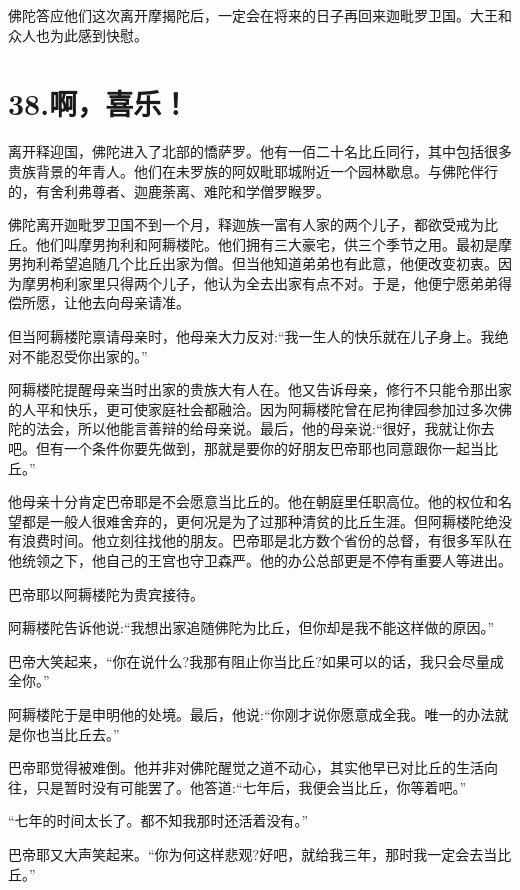 \documentclass[12pt,twoside,openany]{book}
\begin{document}
佛陀答应他们这次离开摩揭陀后，一定会在将来的日子再回来迦毗罗卫国。大王和众人也为此感到快慰。


\chapter{38.啊，喜乐！}\label{ch38}

离开释迎国，佛陀进入了北部的憍萨罗。他有一佰二十名比丘同行，其中包括很多贵族背景的年青人。他们在未罗族的阿奴毗耶城附近一个园林歇息。与佛陀伴行的，有舍利弗尊者、迦鹿荼离、难陀和学僧罗睺罗。

佛陀离开迦毗罗卫国不到一个月，释迦族一富有人家的两个儿子，都欲受戒为比丘。他们叫摩男拘利和阿耨楼陀。他们拥有三大豪宅，供三个季节之用。最初是摩男拘利希望追随几个比丘出家为僧。但当他知道弟弟也有此意，他便改变初衷。因为摩男枸利家里只得两个儿子，他认为全去出家有点不对。于是，他便宁愿弟弟得偿所愿，让他去向母亲请准。

但当阿耨楼陀禀请母亲时，他母亲大力反对:“我一生人的快乐就在儿子身上。我绝对不能忍受你出家的。”

阿耨楼陀提醒母亲当时出家的贵族大有人在。他又告诉母亲，修行不只能令那出家的人平和快乐，更可使家庭社会都融洽。因为阿耨楼陀曾在尼拘律园参加过多次佛陀的法会，所以他能言善辩的给母亲说。最后，他的母亲说:“很好，我就让你去吧。但有一个条件你要先做到，那就是要你的好朋友巴帝耶也同意跟你一起当比丘。”

他母亲十分肯定巴帝耶是不会愿意当比丘的。他在朝庭里任职高位。他的权位和名望都是一般人很难舍弃的，更何况是为了过那种清贫的比丘生涯。但阿耨楼陀绝没有浪费时间。他立刻往找他的朋友。巴帝耶是北方数个省份的总督，有很多军队在他统领之下，他自己的王宫也守卫森严。他的办公总部更是不停有重要人等进出。

巴帝耶以阿耨楼陀为贵宾接待。

阿耨楼陀告诉他说:“我想出家追随佛陀为比丘，但你却是我不能这样做的原因。”

巴帝大笑起来，“你在说什么?我那有阻止你当比丘?如果可以的话，我只会尽量成全你。”

阿耨楼陀于是申明他的处境。最后，他说:“你刚才说你愿意成全我。唯一的办法就是你也当比丘去。”

巴帝耶觉得被难倒。他并非对佛陀醒觉之道不动心，其实他早已对比丘的生活向往，只是暂时没有可能罢了。他答道:“七年后，我便会当比丘，你等着吧。”

“七年的时间太长了。都不知我那时还活着没有。”

巴帝耶又大声笑起来。“你为何这样悲观?好吧，就给我三年，那时我一定会去当比丘。”
\end{document}
